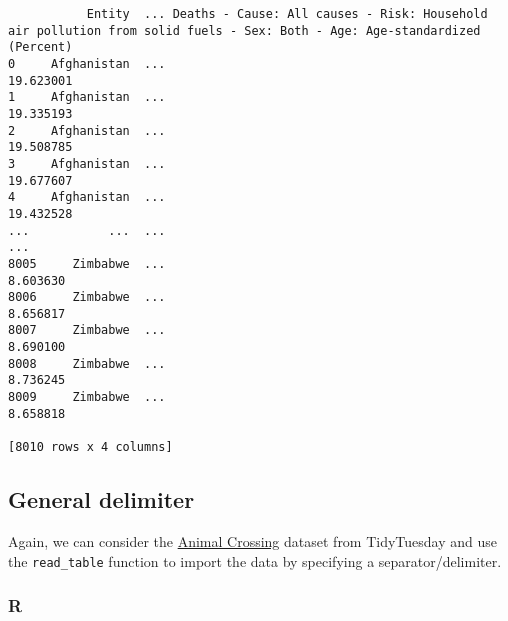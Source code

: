 \documentclass[
  letterpaper,
  DIV=11,
  numbers=noendperiod]{scrreprt}
\begin{document}
\begin{verbatim}
           Entity  ... Deaths - Cause: All causes - Risk: Household air pollution from solid fuels - Sex: Both - Age: Age-standardized (Percent)
0     Afghanistan  ...                                          19.623001                                                                       
1     Afghanistan  ...                                          19.335193                                                                       
2     Afghanistan  ...                                          19.508785                                                                       
3     Afghanistan  ...                                          19.677607                                                                       
4     Afghanistan  ...                                          19.432528                                                                       
...           ...  ...                                                ...                                                                       
8005     Zimbabwe  ...                                           8.603630                                                                       
8006     Zimbabwe  ...                                           8.656817                                                                       
8007     Zimbabwe  ...                                           8.690100                                                                       
8008     Zimbabwe  ...                                           8.736245                                                                       
8009     Zimbabwe  ...                                           8.658818                                                                       

[8010 rows x 4 columns]
\end{verbatim}

\hypertarget{general-delimiter}{%
\subsection{General delimiter}\label{general-delimiter}}

Again, we can consider the
\href{https://github.com/rfordatascience/tidytuesday/blob/master/data/2020/2020-05-05}{Animal
Crossing} dataset from TidyTuesday and use the \texttt{read\_table}
function to import the data by specifying a separator/delimiter.

\hypertarget{r-3}{%
\subsubsection{R}\label{r-3}}
\end{document}
